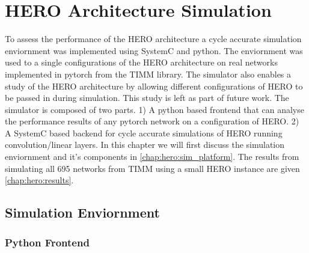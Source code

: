 \chapter{HERO Architecture Simulation}
\label{chap:results}

To assess the performance of the HERO architecture a cycle accurate simulation
enviornment was implemented using SystemC and python. The enviornment was used
to a single configurations of the HERO architecture on real networks implemented
in pytorch from the TIMM library. The simulator also enables a study of the HERO
architecture by allowing different configurations of HERO to be passed in during
simulation. This study is left as part of future work. The simulator is composed
of two parts. 1) A python based frontend that can analyse the performance
results of any pytorch network on a configuration of HERO. 2) A SystemC based
backend for cycle accurate simulations of HERO running convolution/linear layers. In
this chapter we will first discuss the simulation enviornment and it's
components in \autoref{chap:hero:sim_platform}. The results from simulating all
695 networks from TIMM using a small HERO instance are given
\autoref{chap:hero:results}.

\section{Simulation Enviornment}
\label{chap:hero:sim_platform}

\subsection{Python Frontend}
\label{chap:hero:sim_platform:frontend}

